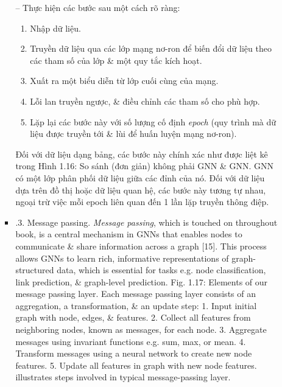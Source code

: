 \documentclass{article}
\begin{document}
\begin{itemize}
\begin{itemize}
\begin{itemize}
            -- Thực hiện các bước sau một cách rõ ràng:
            \begin{enumerate}
                \item Nhập dữ liệu.
                \item Truyền dữ liệu qua các lớp mạng nơ-ron để biến đổi dữ liệu theo các tham số của lớp \& một quy tắc kích hoạt.
                \item Xuất ra một biểu diễn từ lớp cuối cùng của mạng.
                \item Lỗi lan truyền ngược, \& điều chỉnh các tham số cho phù hợp.
                \item Lặp lại các bước này với số lượng cố định {\it epoch} (quy trình mà dữ liệu được truyền tới \& lùi để huấn luyện mạng nơ-ron).
            \end{enumerate}
            Đối với dữ liệu dạng bảng, các bước này chính xác như được liệt kê trong {\sf Hình 1.16: So sánh (đơn giản) không phải GNN \& GNN. GNN có một lớp phân phối dữ liệu giữa các đỉnh của nó.} Đối với dữ liệu dựa trên đồ thị hoặc dữ liệu quan hệ, các bước này tương tự nhau, ngoại trừ việc mỗi epoch liên quan đến 1 lần lặp truyền thông điệp.
            \item {.3. Message passing.} {\it Message passing}, which is touched on throughout book, is a central mechanism in GNNs that enables nodes to communicate \& share information across a graph [15]. This process allows GNNs to learn rich, informative representations of graph-structured data, which is essential for tasks e.g. node classification, link prediction, \& graph-level prediction. {\sf Fig. 1.17: Elements of our message passing layer. Each message passing layer consists of an aggregation, a transformation, \& an update step: 1. Input initial graph with node, edges, \& features. 2. Collect all features from neighboring nodes, known as messages, for each node. 3. Aggregate messages using invariant functions e.g. sum, max, or mean. 4. Transform messages using a neural network to create new node features. 5. Update all features in graph with new node features.} illustrates steps involved in typical message-passing layer.


\end{itemize}
\end{itemize}
\end{itemize}
\end{document}
